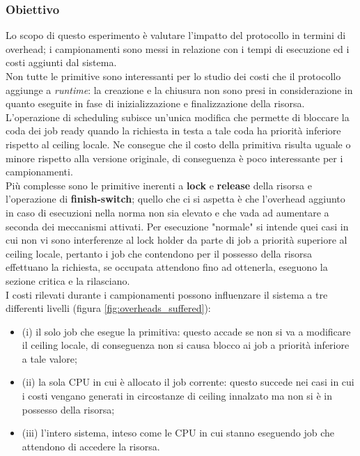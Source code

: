 \subsubsection{Obiettivo}
\label{sec:overhead_ob}

\noindent Lo scopo di questo esperimento è valutare l'impatto del protocollo in termini di overhead; i campionamenti sono messi in relazione con i tempi di esecuzione ed i costi aggiunti dal sistema.\\

\noindent Non tutte le primitive sono interessanti per lo studio dei costi che il protocollo aggiunge a \textit{runtime}: la creazione e la chiusura non sono presi in considerazione in quanto eseguite in fase di inizializzazione e finalizzazione della risorsa.\\

\noindent L'operazione di scheduling subisce un'unica modifica che permette di bloccare la coda dei job ready quando la richiesta in testa a tale coda ha priorità inferiore rispetto al ceiling locale. Ne consegue che il costo della primitiva risulta uguale o minore rispetto alla versione originale, di conseguenza è poco interessante per i campionamenti.\\

\noindent Più complesse sono le primitive inerenti a \textbf{lock} e \textbf{release} della risorsa e l'operazione di \textbf{finish-switch}; quello che ci si aspetta è che l'overhead aggiunto in caso di esecuzioni nella norma non sia elevato e che vada ad aumentare a seconda dei meccanismi attivati. Per esecuzione "normale" si intende quei casi in cui non vi sono interferenze al lock holder da parte di job a priorità superiore al ceiling locale, pertanto i job che contendono per il possesso della risorsa effettuano la richiesta, se occupata attendono fino ad ottenerla, eseguono la sezione critica e la rilasciano.\\

\noindent I costi rilevati durante i campionamenti possono influenzare il sistema a tre differenti livelli (figura \ref{fig:overheads_suffered}):\\

\begin{itemize}
	\item {\color{red} (i)} il solo job che esegue la primitiva: questo accade se non si va a modificare il ceiling locale, di conseguenza non si causa blocco ai job a priorità inferiore a tale valore;
	\item {\color{red} (ii)} la sola CPU in cui è allocato il job corrente: questo succede nei casi in cui i costi vengano generati in circostanze di ceiling innalzato ma non si è in possesso della risorsa;
	\item {\color{red} (iii)} l'intero sistema, inteso come le CPU in cui stanno eseguendo job che attendono di accedere la risorsa.
\end{itemize}

